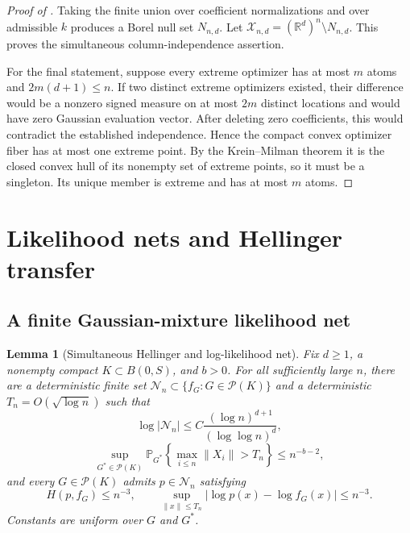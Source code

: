 \documentclass[11pt]{article}
\newtheorem{lemma}[theorem]{Lemma}
\theoremstyle{definition}
\theoremstyle{remark}
\newcommand{\Pcal}{\mathcal P}
\newcommand{\Ncal}{\mathcal N}
\newcommand{\RR}{\mathbb R}
\newcommand{\PP}{\mathbb P}
\newcommand{\norm}[1]{\lVert #1\rVert}
\newcommand{\abs}[1]{\lvert #1\rvert}
\begin{document}
\begin{proof}[Proof of ]
Taking the finite union over coefficient normalizations and over admissible
$k$ produces a Borel null set $N_{n,d}$.  Let
$\mathcal X_{n,d}=(\RR^d)^n\setminus N_{n,d}$.  This proves the simultaneous
column-independence assertion.

For the final statement, suppose every extreme optimizer has at most $m$
atoms and $2m(d+1)\le n$.  If two distinct extreme optimizers existed, their
difference would be a nonzero signed measure on at most $2m$ distinct
locations and would have zero Gaussian evaluation vector.  After deleting
zero coefficients, this would contradict the established independence.
Hence the compact convex optimizer fiber has at most one extreme point.  By
the Krein--Milman theorem it is the closed convex hull of its nonempty set of
extreme points, so it must be a singleton.  Its unique member is extreme and
has at most $m$ atoms.
\end{proof}

\section{Likelihood nets and Hellinger transfer}
\label{app:hellinger}

\subsection{A finite Gaussian-mixture likelihood net}

\begin{lemma}[Simultaneous Hellinger and log-likelihood net]
\label{lem:finite-net}
Fix $d\ge1$, a nonempty compact $K\subset B(0,S)$, and $b>0$.  For all
sufficiently large $n$, there are a deterministic finite set
$\Ncal_n\subset\{f_G:G\in\Pcal(K)\}$ and a deterministic
$T_n=O(\sqrt{\log n})$ such that
\begin{equation}\label{eq:net-size}
 \log\abs{\Ncal_n}
 \le C\frac{(\log n)^{d+1}}{(\log\log n)^d},
\end{equation}
\begin{equation}\label{eq:radius-prob}
 \sup_{G^*\in\Pcal(K)}
 \PP_{G^*}\left\{\max_{i\le n}\norm{X_i}>T_n\right\}
 \le n^{-b-2},
\end{equation}
and every $G\in\Pcal(K)$ admits $p\in\Ncal_n$ satisfying
\begin{equation}\label{eq:net-approx}
 H(p,f_G)\le n^{-3},
 \qquad
 \sup_{\norm{x}\le T_n}\abs{\log p(x)-\log f_G(x)}\le n^{-3}.
\end{equation}
Constants are uniform over $G$ and $G^*$.
\end{lemma}
\end{document}

